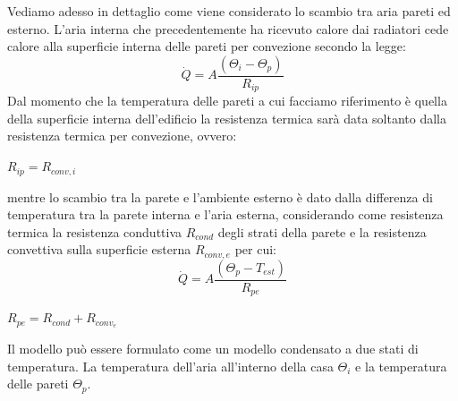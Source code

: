 \documentclass[laurea,oneside,11pt]{USiena_tesiLM}
\begin{document}
Vediamo adesso in dettaglio come viene considerato lo scambio tra aria pareti ed esterno. L'aria interna che precedentemente ha ricevuto calore dai radiatori cede calore alla superficie interna delle pareti per convezione secondo la legge:
\begin{equation}
\dot{Q} = A \frac{(\Theta_i - \Theta_p)}{R_{ip}} 
\end{equation} 
Dal momento che la temperatura delle pareti a cui facciamo riferimento è quella della superficie interna dell'edificio la resistenza termica sarà data soltanto dalla resistenza termica per convezione, ovvero:
\begin{center}
$R_{ip} = R_{conv,i}$
\end{center}

mentre lo scambio tra la parete e l'ambiente esterno è dato dalla differenza di temperatura tra la parete interna e l'aria  esterna, considerando come resistenza termica la resistenza conduttiva $R_{cond}$ degli strati della parete e la resistenza convettiva sulla superficie esterna $R_{conv,e}$ per cui:
\begin{equation}
\dot{Q} = A \frac{(\Theta_p - T_{est})}{R_{pe}} 
\end{equation} 
\begin{center}
$R_{pe} = R_{cond} + R_{conv_e}$
\end{center}

Il modello può essere formulato come un modello condensato a due stati di temperatura. La temperatura dell'aria all'interno della casa $\Theta_i$ e la temperatura delle pareti $\Theta_p$.
\end{document}
